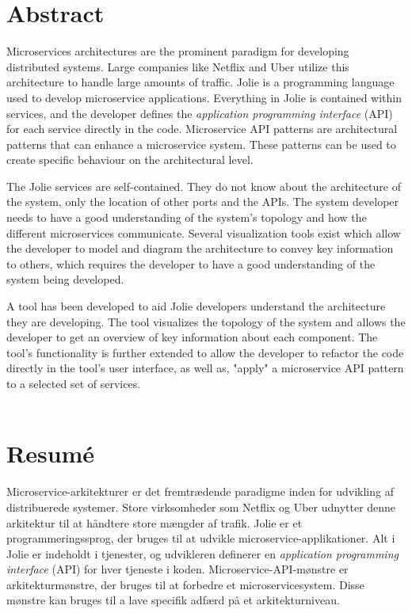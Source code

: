 \section*{\centering Abstract}
Microservices architectures are the prominent paradigm for developing distributed systems.
Large companies like Netflix and Uber utilize this architecture to handle large amounts of traffic.
Jolie is a programming language used to develop microservice applications.
Everything in Jolie is contained within services, and the developer defines the \emph{application programming interface} (API) for each service directly in the code.
Microservice API patterns are architectural patterns that can enhance a microservice system.
These patterns can be used to create specific behaviour on the architectural level.

The Jolie services are self-contained. They do not know about the architecture of the system, only the location of other ports and the APIs.
The system developer needs to have a good understanding of the system's topology and how the different microservices communicate.
Several visualization tools exist which allow the developer to
 model and diagram the architecture to convey key information to others, which requires the developer to have a good understanding of the system being developed.

A tool has been developed to aid Jolie developers understand the architecture they are developing. The tool visualizes the topology of the system and allows the developer to 
get an overview of key information about each component. The tool's functionality is further extended to allow the developer to refactor the code directly in the tool's user interface, as well as, "apply" a microservice API pattern to a selected set of services.
\\
\\
\section*{\centering Resumé}
Microservice-arkitekturer er det fremtrædende paradigme inden for udvikling af distribuerede systemer.
Store virksomheder som Netflix og Uber udnytter denne arkitektur til at håndtere store mængder af trafik.
Jolie er et programmeringssprog, der bruges til at udvikle microservice-applikationer.
Alt i Jolie er indeholdt i tjenester, og udvikleren definerer en \emph{application programming interface} (API) for hver tjeneste i koden.
Microservice-API-mønstre er arkitekturmønstre, der bruges til at forbedre et microservicesystem.
Disse mønstre kan bruges til a lave specifik adfærd på et arkitekturniveau.

